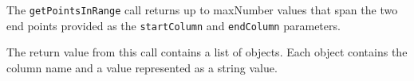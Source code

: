The \verb+getPointsInRange+ call returns up to maxNumber values that span the two end points provided as the
\verb+startColumn+ and \verb+endColumn+ parameters.

The return value from this call contains a list of objects. Each object contains the column name and a value represented
as a string value.
